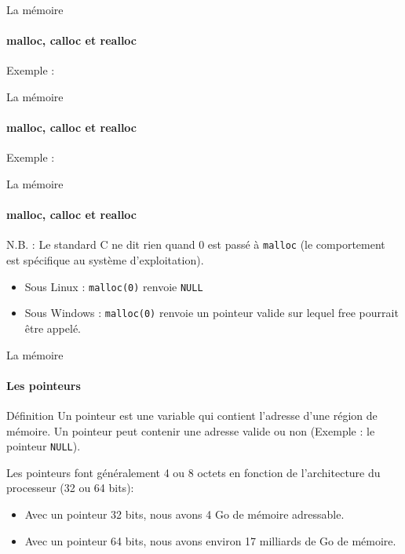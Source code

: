 \documentclass{beamer}
\begin{document}
\begin{darkframes}
	\begin{frame}{La mémoire}
		\framesubtitle{malloc, calloc et realloc}
		\begin{exampleblock}{Exemple :}
			\reallocExampleOne
		\end{exampleblock}
	\end{frame}

	\begin{frame}{La mémoire}
		\framesubtitle{malloc, calloc et realloc}
		\begin{exampleblock}{Exemple :}
			\reallocExampleTwo
		\end{exampleblock}
	\end{frame}

	\begin{frame}{La mémoire}
		\framesubtitle{malloc, calloc et realloc}
		\begin{alertblock}{N.B. :}
			Le standard C ne dit rien quand 0 est passé à \texttt{malloc} (le comportement est spécifique au système d'exploitation).
			\begin{itemize}
				\item Sous Linux : \texttt{malloc(0)} renvoie \texttt{NULL}
				\item Sous Windows : \texttt{malloc(0)} renvoie un pointeur \alert{valide} sur lequel free pourrait être appelé.
			\end{itemize}
		\end{alertblock}
	\end{frame}

	\begin{frame}{La mémoire}
		\framesubtitle{Les pointeurs}
		\begin{block}{Définition}
			Un pointeur est une variable qui contient l'adresse d'une région de mémoire. Un pointeur peut contenir une adresse valide ou non (Exemple : le pointeur \texttt{NULL}). \\
		\end{block}
		Les pointeurs font généralement 4 ou 8 octets en fonction de l'architecture du processeur (32 ou 64 bits): 
		\begin{itemize}
			\item Avec un pointeur 32 bits, nous avons 4 Go de mémoire adressable.
			\item Avec un pointeur 64 bits, nous avons environ 17 milliards de Go de mémoire.
		\end{itemize}
	\end{frame}



\end{darkframes}
\end{document}
